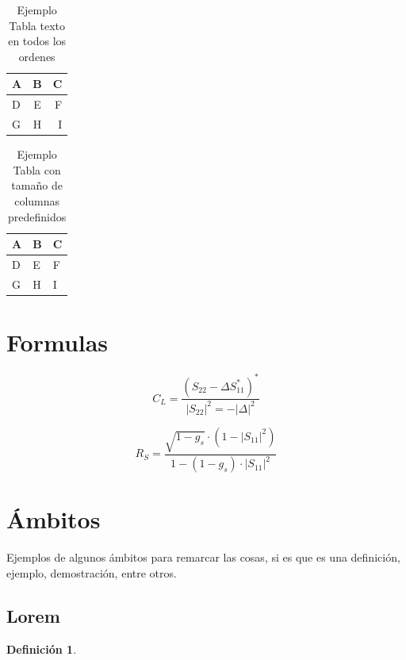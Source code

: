 \documentclass[letter,12pt]{report}
\newtheorem{definir}{Definición}
\begin{document}
\begin{table}[H]
\centering
\begin{tabular}{|l|c|r|}\hline
  A&B &C \\
  \hline
  D&E &F \\
 G & H& I\\\hline
\end{tabular}
\caption{Ejemplo Tabla texto en todos los ordenes}
\label{t:02}
\end{table}

\blindtext %

\begin{table}[H]
\centering
\begin{tabular}{|p{3cm}|p{5cm}|p{2cm}|}\hline
  A&B &C \\
  \hline
  D&E &F \\
 G & H& I\\\hline
\end{tabular}
\caption{Ejemplo Tabla con tamaño de columnas predefinidos}
\label{t:03}
\end{table}
\section{Formulas}

\blindtext %


\begin{displaymath}C_L=\frac{(S_{22}-\Delta S_{11}^*)^*}{|S_{22}|^2=-|\Delta|^2}\end{displaymath}
    
\begin{displaymath}R_S=\frac{\sqrt{1-g_s}\cdot (1-|S_{11}|^2)}{1-(1-g_s)\cdot|S_{11}|^2}\end{displaymath}


\section{Ámbitos}
Ejemplos de algunos ámbitos para remarcar las cosas, si es que es una definición, ejemplo, demostración, entre otros.
\subsection{Lorem}
\blindtext %

\begin{definir}\label{def:01}
\blindtext %
\end{definir}
\end{document}
